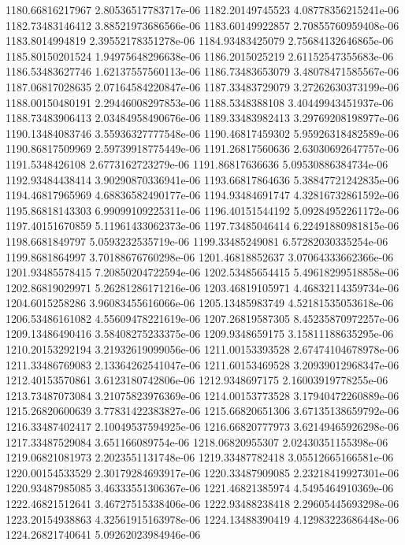 {1180.66816217967 2.80536517783717e-06
1182.20149745523 4.08778356215241e-06
1182.73483146412 3.88521973686566e-06
1183.60149922857 2.70855760959408e-06
1183.8014994819 2.39552178351278e-06
1184.93483425079 2.75684132646865e-06
1185.80150201524 1.94975648296638e-06
1186.2015025219 2.61152547355683e-06
1186.53483627746 1.62137557560113e-06
1186.73483653079 3.48078471585567e-06
1187.06817028635 2.07164584220847e-06
1187.33483729079 3.27262630373199e-06
1188.00150480191 2.29446008297853e-06
1188.5348388108 3.40449943451937e-06
1188.73483906413 2.03484958490676e-06
1189.33483982413 3.29769208198977e-06
1190.13484083746 3.55936327777548e-06
1190.46817459302 5.95926318482589e-06
1190.86817509969 2.59739918775449e-06
1191.26817560636 2.63030692647757e-06
1191.5348426108 2.6773162723279e-06
1191.86817636636 5.09530886384734e-06
1192.93484438414 3.90290870336941e-06
1193.66817864636 5.38847721242835e-06
1194.46817965969 4.68836582490177e-06
1194.93484691747 4.32816732861592e-06
1195.86818143303 6.99099109225311e-06
1196.40151544192 5.09284952261172e-06
1197.40151670859 5.11961433062373e-06
1197.73485046414 6.22491880981815e-06
1198.6681849797 5.0593232535719e-06
1199.33485249081 6.57282030335254e-06
1199.8681864997 3.70188676760298e-06
1201.46818852637 3.07064333662366e-06
1201.93485578415 7.20850204722594e-06
1202.53485654415 5.49618299518858e-06
1202.86819029971 5.26281286171216e-06
1203.46819105971 4.46832114359734e-06
1204.6015258286 3.96083455616066e-06
1205.13485983749 4.52181535053618e-06
1206.53486161082 4.55609478221619e-06
1207.26819587305 8.45235870972257e-06
1209.13486490416 3.58408275233375e-06
1209.9348659175 3.15811188635295e-06
1210.20153292194 3.21932619099056e-06
1211.00153393528 2.67474104678978e-06
1211.33486769083 2.13364262541047e-06
1211.60153469528 3.20939012968347e-06
1212.40153570861 3.6123180742806e-06
1212.9348697175 2.16003919778255e-06
1213.73487073084 3.21075823976369e-06
1214.00153773528 3.17940472260889e-06
1215.26820600639 3.77831422383827e-06
1215.66820651306 3.67135138659792e-06
1216.33487402417 2.10049537594925e-06
1216.66820777973 3.62149465926298e-06
1217.33487529084 3.651166089754e-06
1218.06820955307 2.02430351155398e-06
1219.06821081973 2.2023551131748e-06
1219.33487782418 3.05512665166581e-06
1220.00154533529 2.30179284693917e-06
1220.33487909085 2.23218419927301e-06
1220.93487985085 3.46333551306367e-06
1221.46821385974 4.5495464910369e-06
1222.46821512641 3.46727515338406e-06
1222.93488238418 2.29605445693298e-06
1223.20154938863 4.32561915163978e-06
1224.13488390419 4.12983223686448e-06
1224.26821740641 5.09262023984946e-06
}
